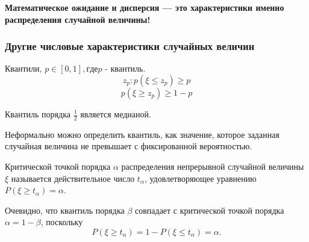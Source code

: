 \begin{center}
	\textbf{Математическое ожидание и дисперсия — это характеристики именно распределения случайной величины!}
\end{center}

\subsubsection{Другие числовые характеристики случайных величин}

\begin{definition}[Квантили]
	Квантили, $p \in [0, 1], где p$ - квантиль.
	\[ z_p: p(\xi \le z_p) \ge p \]
	\[ p(\xi \ge z_p) \ge 1 - p \]
	
	\noindent Квантиль порядка $\frac{1}{2}$ является медианой.
	\begin{figure}[H]
	\end{figure}
	Неформально можно определить квантиль, как значение, которое заданная случайная величина не превышает с фиксированной вероятностью.
\end{definition}

\begin{definition}
	Критической точкой порядка $\alpha$ распределения непрерывной случайной величины $\xi$ называется действительное число $t_{\alpha}$, удовлетворяющее уравнению $P(\xi \ge t_{\alpha}) = \alpha$.
	
	Очевидно, что квантиль порядка $\beta$ совпадает с критической точкой порядка $\alpha = 1 - \beta$, поскольку
	\[ P(\xi \ge t_{\alpha}) = 1 - P(\xi \le t_{\alpha}) = \alpha. \]
\end{definition}

